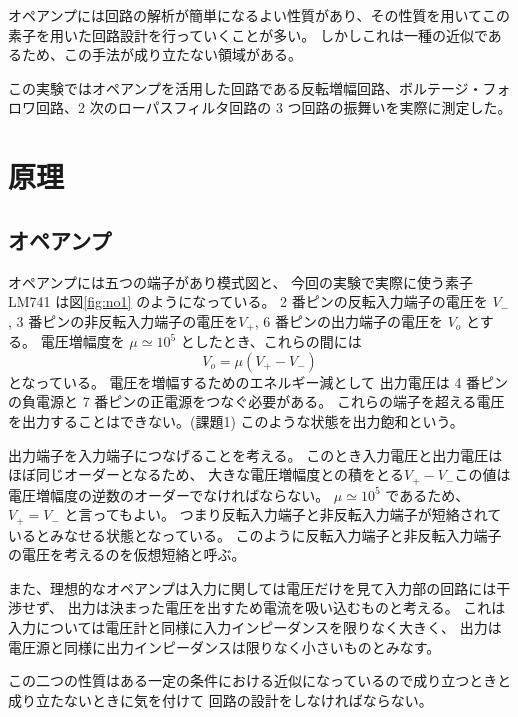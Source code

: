 \documentclass[11pt,dvipdfmx,a4paper]{jsarticle}
\begin{document}
オペアンプには回路の解析が簡単になるよい性質があり、その性質を用いてこの素子を用いた回路設計を行っていくことが多い。
しかしこれは一種の近似であるため、この手法が成り立たない領域がある。

この実験ではオペアンプを活用した回路である反転増幅回路、ボルテージ・フォロワ回路、2 次のローパスフィルタ回路の 3 つ回路の振舞いを実際に測定した。

\section{原理}
\subsection{オペアンプ}

オペアンプには五つの端子があり模式図と、
今回の実験で実際に使う素子 LM741 は図\ref{fig:no1} のようになっている。
2 番ピンの反転入力端子の電圧を \(V_{-}\), 3 番ピンの非反転入力端子の電圧を\(V_{+}\), 6 番ピンの出力端子の電圧を \(V_o\) とする。
電圧増幅度を \(\mu\simeq 10^5\) としたとき、これらの間には
\begin{equation}
	V_o = \mu (V_{+} - V_{-})
\end{equation}
となっている。
電圧を増幅するためのエネルギー減として
出力電圧は 4 番ピンの負電源と 7 番ピンの正電源をつなぐ必要がある。
これらの端子を超える電圧を出力することはできない。(課題1)
このような状態を出力飽和という。

出力端子を入力端子につなげることを考える。
このとき入力電圧と出力電圧はほぼ同じオーダーとなるため、
大きな電圧増幅度との積をとる\(V_{+} - V_{-}\)この値は 電圧増幅度の逆数のオーダーでなければならない。
\(\mu\simeq10^5\) であるため、\(V_{+}=V_{-}\) と言ってもよい。
つまり反転入力端子と非反転入力端子が短絡されているとみなせる状態となっている。
このように反転入力端子と非反転入力端子の電圧を考えるのを仮想短絡と呼ぶ。

また、理想的なオペアンプは入力に関しては電圧だけを見て入力部の回路には干渉せず、
出力は決まった電圧を出すため電流を吸い込むものと考える。
これは入力については電圧計と同様に入力インピーダンスを限りなく大きく、
出力は電圧源と同様に出力インピーダンスは限りなく小さいものとみなす。

この二つの性質はある一定の条件における近似になっているので成り立つときと成り立たないときに気を付けて
回路の設計をしなければならない。
\end{document}
